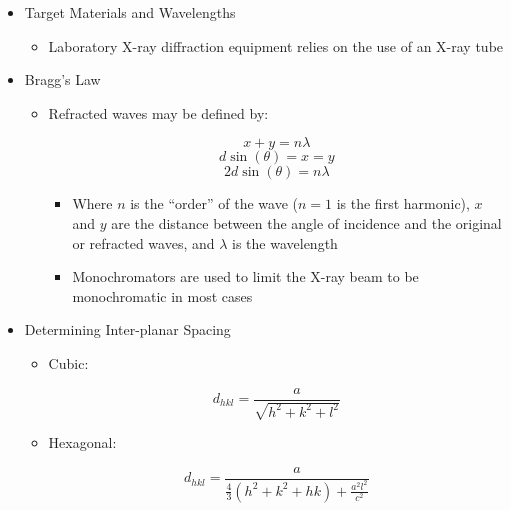 \begin{itemize}

  \item Target Materials and Wavelengths

    \begin{itemize}

      \item Laboratory X-ray diffraction equipment relies on the use of an X-ray tube

    \end{itemize}

  \item Bragg's Law

    \begin{itemize}

      \item Refracted waves may be defined by:

        $$x+y=n\lambda$$
        $$d\sin(\theta)=x=y$$
        $$2d\sin(\theta)=n\lambda$$

        \begin{itemize}

          \item Where $n$ is the ``order'' of the wave ($n=1$ is the first harmonic), $x$ and $y$ are the distance between the angle of incidence and the original or refracted waves, and $\lambda$ is the wavelength

          \item Monochromators are used to limit the X-ray beam to be monochromatic in most cases

        \end{itemize}

    \end{itemize}

  \item Determining Inter-planar Spacing

    \begin{itemize}

      \item Cubic:

        $$d_{hkl}=\frac{a}{\sqrt{h^2+k^2+l^2}}$$

      \item Hexagonal:

        $$d_{hkl}=\frac{a}{\frac{4}{3}(h^2+k^2+hk)+\frac{a^2l^2}{c^2}}$$

    \end{itemize}

\end{itemize}



